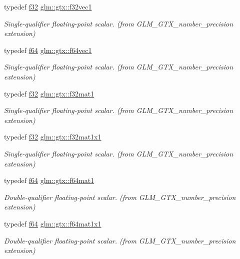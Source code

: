 \begin{DoxyCompactItemize}
typedef \hyperlink{group__gtc__type__precision_ga0ec999b57f5330d9021256e96038df04}{f32} \hyperlink{group__gtx__number__precision_gadab8e598b0b4697629482682bdb7f223}{glm\+::gtx\+::f32vec1}
\begin{DoxyCompactList}\small\item\em Single-\/qualifier floating-\/point scalar. (from G\+L\+M\+\_\+\+G\+T\+X\+\_\+number\+\_\+precision extension) \end{DoxyCompactList}\item 
typedef \hyperlink{group__gtc__type__precision_ga2bba392e555124b36cde6abba349bab3}{f64} \hyperlink{group__gtx__number__precision_ga44336a26c958d66efdfb5a6c114c538e}{glm\+::gtx\+::f64vec1}
\begin{DoxyCompactList}\small\item\em Single-\/qualifier floating-\/point scalar. (from G\+L\+M\+\_\+\+G\+T\+X\+\_\+number\+\_\+precision extension) \end{DoxyCompactList}\item 
typedef \hyperlink{group__gtc__type__precision_ga0ec999b57f5330d9021256e96038df04}{f32} \hyperlink{group__gtx__number__precision_gae5ff376ec910c360f06acc0c2b99260c}{glm\+::gtx\+::f32mat1}
\begin{DoxyCompactList}\small\item\em Single-\/qualifier floating-\/point scalar. (from G\+L\+M\+\_\+\+G\+T\+X\+\_\+number\+\_\+precision extension) \end{DoxyCompactList}\item 
typedef \hyperlink{group__gtc__type__precision_ga0ec999b57f5330d9021256e96038df04}{f32} \hyperlink{group__gtx__number__precision_ga01caec78388a82a9a22bd45e5751a38a}{glm\+::gtx\+::f32mat1x1}
\begin{DoxyCompactList}\small\item\em Single-\/qualifier floating-\/point scalar. (from G\+L\+M\+\_\+\+G\+T\+X\+\_\+number\+\_\+precision extension) \end{DoxyCompactList}\item 
typedef \hyperlink{group__gtc__type__precision_ga2bba392e555124b36cde6abba349bab3}{f64} \hyperlink{group__gtx__number__precision_ga23f8f53c78b50aa07a113c3d07d01bc9}{glm\+::gtx\+::f64mat1}
\begin{DoxyCompactList}\small\item\em Double-\/qualifier floating-\/point scalar. (from G\+L\+M\+\_\+\+G\+T\+X\+\_\+number\+\_\+precision extension) \end{DoxyCompactList}\item 
typedef \hyperlink{group__gtc__type__precision_ga2bba392e555124b36cde6abba349bab3}{f64} \hyperlink{group__gtx__number__precision_ga710a5952d78b22635c71c5fc2c0a3319}{glm\+::gtx\+::f64mat1x1}
\begin{DoxyCompactList}\small\item\em Double-\/qualifier floating-\/point scalar. (from G\+L\+M\+\_\+\+G\+T\+X\+\_\+number\+\_\+precision extension) \end{DoxyCompactList}\end{DoxyCompactItemize}


